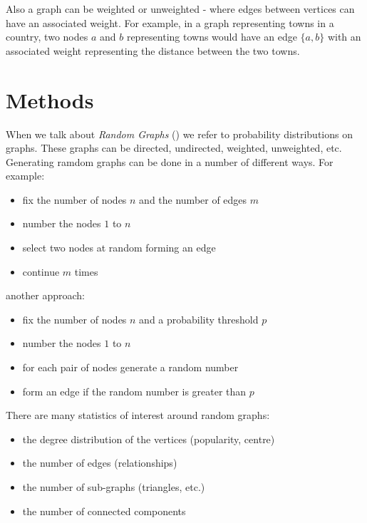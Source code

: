 \documentclass{report}
\begin{document}
Also a graph can be weighted or unweighted - where edges between vertices can have an associated weight. 
For example, in a graph representing towns in a country, two nodes $a$ and $b$ representing towns would 
have an edge $\{a, b\}$ with an associated weight representing the distance between the two towns. \bigskip














\chapter{Methods}


When we talk about \textit{Random Graphs} (\cite{book1, article1}) we refer to probability distributions on 
graphs. These graphs can be directed, undirected, weighted, unweighted, etc. Generating ramdom graphs can 
be done in a number of different ways. For example: \bigskip

\begin{itemize}
	\item fix the number of nodes $n$ and the number of edges $m$
	\item number the nodes $1$ to $n$
	\item select two nodes at random forming an edge
	\item continue $m$ times 
\end{itemize}\medskip

another approach: \bigskip

\begin{itemize}
	\item fix the number of nodes $n$ and a probability threshold $p$
	\item number the nodes $1$ to $n$
	\item for each pair of nodes generate a random number
	\item form an edge if the random number is greater than $p$ 
\end{itemize}\medskip

There are many statistics of interest around random graphs: \bigskip

\begin{itemize}
	\item the degree distribution of the vertices (popularity, centre)
	\item the number of edges (relationships)
	\item the number of sub-graphs (triangles, etc.)
	\item the number of connected components
\end{itemize}\medskip
\end{document}
